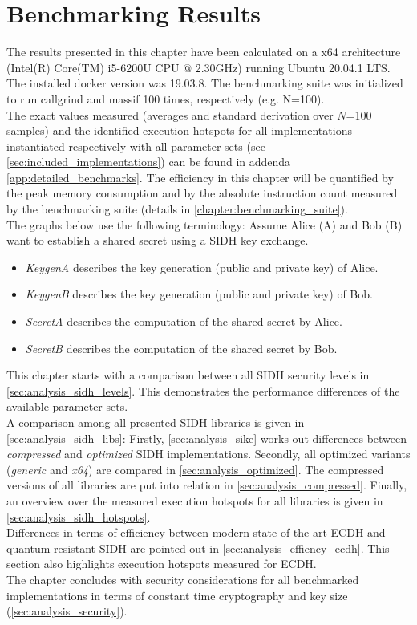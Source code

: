 \chapter{Benchmarking Results}\label{chapter:analysis}

The results presented in this chapter have been calculated on a x64 architecture (Intel(R) Core(TM) i5-6200U CPU @ 2.30GHz) running Ubuntu 20.04.1 LTS. The installed docker version was 19.03.8. The benchmarking suite was initialized to run callgrind and massif 100 times, respectively (e.g. N=100).\\
The exact values measured (averages and standard derivation over $N$=100 samples) and the identified execution hotspots for all implementations instantiated respectively with all parameter sets (see \autoref{sec:included_implementations}) can be found in addenda \ref{app:detailed_benchmarks}. The efficiency in this chapter will be quantified by the peak memory consumption and by the absolute instruction count measured by the benchmarking suite (details in \autoref{chapter:benchmarking_suite}). \\
The graphs below use the following terminology:
Assume Alice (A) and Bob (B) want to establish a shared secret using a \gls{SIDH} key exchange.
\begin{itemize}
\item \textit{KeygenA} describes the key generation (public and private key) of Alice.
\item \textit{KeygenB} describes the key generation (public and private key) of Bob.
\item \textit{SecretA} describes the computation of the shared secret by Alice.
\item \textit{SecretB} describes the computation of the shared secret by Bob.
\end{itemize}
This chapter starts with a comparison between all \gls{SIDH} security levels in \autoref{sec:analysis_sidh_levels}. This demonstrates the performance differences of the available parameter sets. \\
A comparison among all presented \gls{SIDH} libraries is given in \autoref{sec:analysis_sidh_libs}: Firstly, \ref{sec:analysis_sike} works out differences between \textit{compressed} and \textit{optimized} \gls{SIDH} implementations. Secondly, all optimized variants (\textit{generic} and \textit{x64}) are compared in \ref{sec:analysis_optimized}. The compressed versions of all libraries are put into relation in \ref{sec:analysis_compressed}. Finally, an overview over the measured execution hotspots for all libraries is given in \ref{sec:analysis_sidh_hotspots}.\\
Differences in terms of efficiency between modern state-of-the-art \gls{ECDH} and quantum-resistant \gls{SIDH} are pointed out in \autoref{sec:analysis_effiency_ecdh}. This section also highlights execution hotspots measured for \gls{ECDH}.\\
The chapter concludes with security considerations for all benchmarked implementations in terms of constant time cryptography and key size (\autoref{sec:analysis_security}). 

